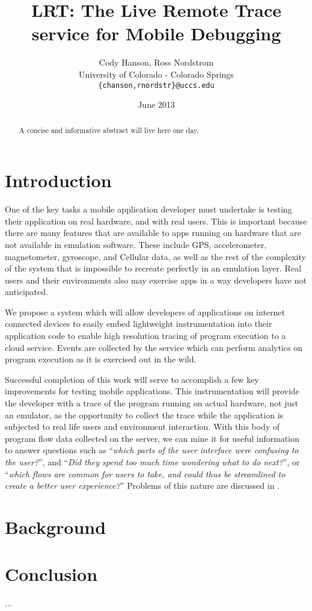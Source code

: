 \documentclass{acm_proc_article-sp}
\begin{document}
\title{LRT: The Live Remote Trace service for Mobile Debugging}
\author{Cody Hanson, Ross Nordstrom\\
        University of Colorado - Colorado Springs\\
        \texttt{\{chanson,rnordstr\}@uccs.edu}
       }
\date{June 2013}

\maketitle

\begin{abstract}
A concise and informative abstract will live here one day.
\end{abstract}

\section{Introduction}
One of the key tasks a mobile application developer must undertake is testing 
their application on real hardware, and with real users. This is important 
because there are many features that are available to apps running on hardware 
that are not available in emulation software. These include GPS, accelerometer, 
magnetometer, gyroscope, and Cellular data, as well as the rest of the 
complexity of the system that is impossible to recreate perfectly in an 
emulation layer. Real users and their environments also may exercise apps in
a way developers have not anticipated. 

We propose a system which will allow developers of applications on internet connected 
devices to easily embed lightweight instrumentation 
into their application code to enable high resolution 
tracing of program execution to a cloud service. Events are collected by 
the service which can perform analytics on program execution as it is 
exercised out in the wild.

Successful completion of this work will serve to accomplish a few key 
improvements for testing mobile applications. This instrumentation will provide 
the developer with a trace of the program running on actual hardware, not just 
an emulator, as the opportunity to collect the trace while the application is 
subjected to real life users and environment interaction. With this 
body of program flow data collected on the server, we can mine it for useful 
information to answer questions such as ``\emph{which parts of the user interface were 
confusing to the user?}'', and ``\emph{Did they spend too much time wondering what to do 
next?}'', or ``\emph{which flows are common for users to take, and could thus be 
streamlined to create a better user experience?}'' Problems of this nature are 
discussed in \cite{WebAntiPattern}.

\section{Background}












\section{Conclusion}
...

{}

\end{document}
